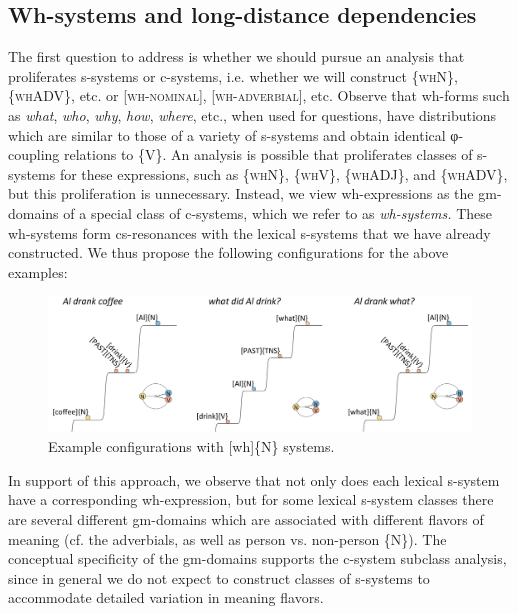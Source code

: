 \subsection{Wh-systems and long-distance dependencies}

The first question to address is whether we should pursue an analysis that proliferates s-systems or c-systems, i.e. whether we will construct \{\textsc{whN}\}, \{\textsc{whADV}\}, etc. or [\textsc{wh-nominal}], [\textsc{wh-adverbial}], etc. Observe that wh-forms such as \textit{what}, \textit{who}, \textit{why}, \textit{how}, \textit{where}, etc., when used for questions, have distributions which are similar to those of a variety of s-systems and obtain identical φ-coupling relations to \{V\}. An analysis is possible that proliferates classes of s-systems for these expressions, such as \{\textsc{whN}\}, \{\textsc{whV}\}, \{\textsc{whADJ}\}, and \{\textsc{whADV}\}, but this proliferation is unnecessary. Instead, we view wh-expressions as the gm-domains of a special class of c-systems, which we refer to as \textit{wh-systems.} These wh-systems form cs-resonances with the lexical s-systems that we have already constructed. We thus propose the following configurations for the above examples:

  
\begin{figure}
\includegraphics[width=\textwidth]{figures/Tilsen-img158.png}
\caption{Example configurations with [wh]\{N\} systems.}
\label{fig:7:14}
\end{figure}
 

  In support of this approach, we observe that not only does each lexical s-system have a corresponding wh-expression, but for some lexical s-system classes there are several different gm-domains which are associated with different flavors of meaning (cf. the adverbials, as well as person vs. non-person \{N\}). The conceptual specificity of the gm-domains supports the c-system subclass analysis, since in general we do not expect to construct classes of s-systems to accommodate detailed variation in meaning flavors.

